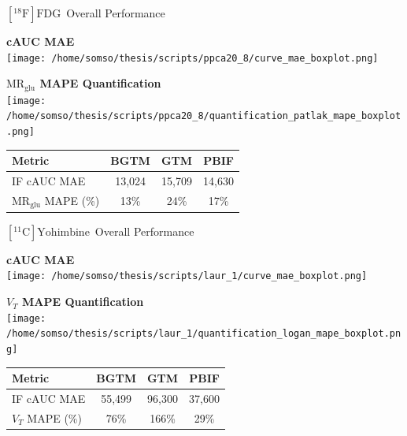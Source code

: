 \documentclass[aspectratio=169]{beamer}
\def\mrglu{\text{MR}_{\text{glu}}}
\newcommand{\fdg}{$[^{18}\mathrm{F}]\text{FDG}$}
\newcommand{\yohimbine}{$[^{11}\mathrm{C}]\text{Yohimbine}$}
\begin{document}
\begin{frame}[t]{\fdg\ Overall Performance}
	\centering

	\begin{center}
		\begin{minipage}{0.35\textwidth}
			\centering
			\textbf{cAUC MAE}\\[0.5ex]
			\texttt{[image: /home/somso/thesis/scripts/ppca20\_8/curve\_mae\_boxplot.png]}
		\end{minipage}
		\hspace{2em}
		\begin{minipage}{0.35\textwidth}
			\centering
			\textbf{$\mrglu$ MAPE Quantification}\\[0.5ex]
			\texttt{[image: /home/somso/thesis/scripts/ppca20\_8/quantification\_patlak\_mape\_boxplot.png]}
		\end{minipage}
	\end{center}
	{
	\small
	\begin{tabular}{l|ccc}
		\toprule
		Metric             & BGTM   & GTM    & PBIF   \\
		\midrule
		IF cAUC MAE        & 13,024 & 15,709 & 14,630 \\
		$\mrglu$ MAPE (\%) & 13\%   & 24\%   & 17\%   \\
		\bottomrule
	\end{tabular}
	}
\end{frame}

\begin{frame}[t]{\yohimbine\ Overall Performance}
	\centering

	\begin{center}
		\begin{minipage}{0.35\textwidth}
			\centering
			\textbf{cAUC MAE}\\[0.5ex]
			\texttt{[image: /home/somso/thesis/scripts/laur\_1/curve\_mae\_boxplot.png]}
		\end{minipage}
		\hspace{2em}
		\begin{minipage}{0.35\textwidth}
			\centering
			\textbf{$V_T$ MAPE Quantification}\\[0.5ex]
			\texttt{[image: /home/somso/thesis/scripts/laur\_1/quantification\_logan\_mape\_boxplot.png]}
		\end{minipage}
	\end{center}

	{
	\small
	\begin{tabular}{l|ccc}
		\toprule
		Metric          & BGTM   & GTM    & PBIF   \\
		\midrule
		IF cAUC MAE     & 55,499 & 96,300 & 37,600 \\
		$V_T$ MAPE (\%) & 76\%   & 166\%  & 29\%   \\
		\bottomrule
	\end{tabular}

	}
\end{frame}
\end{document}
